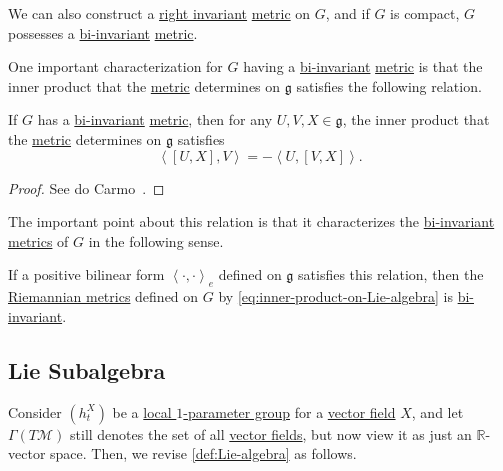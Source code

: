 \begin{remark}
	We can also construct a \hyperref[def:Riemannian-metric-right-invariant]{right invariant} \hyperref[def:Riemannian-metric]{metric} on \(G\), and if \(G\) is compact, \(G\) possesses a \hyperref[def:Riemannian-metric-left-invariant]{bi-invariant} \hyperref[def:Riemannian-metric]{metric}.
\end{remark}

One important characterization for \(G\) having a \hyperref[def:Riemannian-metric-left-invariant]{bi-invariant} \hyperref[def:Riemannian-metric]{metric} is that the inner product that the \hyperref[def:Riemannian-metric]{metric} determines on \(\mathfrak{g} \) satisfies the following relation.

\begin{proposition}
	If \(G\) has a \hyperref[def:Riemannian-metric-left-invariant]{bi-invariant} \hyperref[def:Riemannian-metric]{metric}, then for any \(U, V, X\in \mathfrak{g} \), the inner product that the \hyperref[def:Riemannian-metric]{metric} determines on \(\mathfrak{g} \) satisfies
	\[
		\left\langle [U, X], V \right\rangle = -\left\langle U, [V, X] \right\rangle.
	\]
\end{proposition}
\begin{proof}
	See do Carmo~\cite[Page 40, 41]{flaherty2013riemannian}.
\end{proof}

The important point about this relation is that it characterizes the \hyperref[def:Riemannian-metric-left-invariant]{bi-invariant} \hyperref[def:Riemannian-metric]{metrics} of \(G\) in the following sense.

\begin{remark}
	If a positive bilinear form \(\left\langle \cdot, \cdot \right\rangle _e \) defined on \(\mathfrak{g} \) satisfies this relation, then the \hyperref[def:Riemannian-metric]{Riemannian metrics} defined on \(G\) by \autoref{eq:inner-product-on-Lie-algebra} is \hyperref[def:Riemannian-metric-left-invariant]{bi-invariant}.
\end{remark}

\subsection{Lie Subalgebra}
Consider \((h^X_t)\) be a \hyperref[def:local-1-parameter-group]{local \(1\)-parameter group} for a \hyperref[def:vector-field]{vector field} \(X\), and let \(\Gamma (T\mathcal{M} )\) still denotes the set of all \hyperref[def:vector-field]{vector fields}, but now view it as just an \(\mathbb{R} \)-vector space. Then, we revise \autoref{def:Lie-algebra} as follows.

